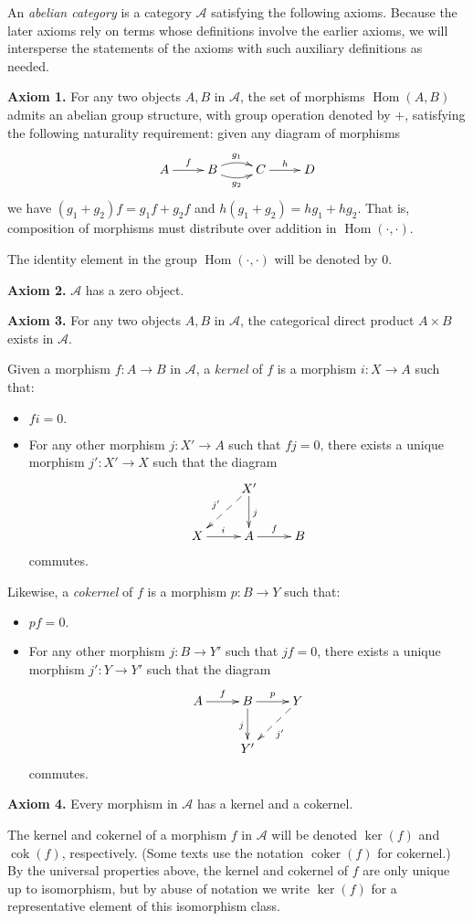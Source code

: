\documentclass[12pt]{article}
\newcommand{\A}{\mathcal{A}}
\newcommand{\Hom}{\operatorname{Hom}}
\newcommand{\cok}{\operatorname{cok}}
\begin{document}
An \emph{abelian category} is a category $\A$ satisfying the following axioms. Because the later axioms rely on terms whose definitions involve the earlier axioms, we will intersperse the statements of the axioms with such auxiliary definitions as needed.

\textbf{Axiom 1.} For any two objects $A,B$ in $\A$, the set of morphisms $\Hom(A,B)$ admits an abelian group structure, with group operation denoted by $+$, satisfying the following naturality requirement: given any diagram of morphisms
$$
\xymatrix{
A \ar[r]^{f} & B \ar@/_/[r]_{g_2} \ar@/^/[r]^{g_1} & C \ar[r]^h & D
}
$$
we have $(g_1+g_2) f = g_1 f + g_2 f$ and $h (g_1 + g_2) = h g_1 + h g_2$.
That is, composition of morphisms must distribute over addition in $\Hom(\cdot,\cdot)$.

The identity element in the group $\Hom(\cdot,\cdot)$ will be denoted by $0$.

\textbf{Axiom 2.} $\A$ has a zero object.

\textbf{Axiom 3.} For any two objects $A,B$ in $\A$, the categorical direct product $A \times B$ exists in $\A$.

Given a morphism $f\colon A \to B$ in $\A$, a \emph{kernel} of $f$ is a morphism $i\colon X \to A$ such that:

\begin{itemize}
\item $fi = 0.$
\item For any other morphism $j\colon X' \to A$ such that $fj = 0$, there exists a unique morphism $j'\colon X' \to X$ such that the diagram
$$
\xymatrix{
& X' \ar[d]^j \ar@{-->}[dl]_{j'} \\
X \ar[r]^i & A \ar[r]^f & B
}
$$
commutes.
\end{itemize}
Likewise, a \emph{cokernel} of $f$ is a morphism $p\colon B \to Y$ such that:
\begin{itemize}
\item $pf = 0.$
\item For any other morphism $j\colon B \to Y'$ such that $jf = 0$, there exists a unique morphism $j'\colon Y \to Y'$ such that the diagram
$$
\xymatrix{
A \ar[r]^f & B \ar[r]^p \ar[d]_j & Y \ar@{-->}[dl]^{j'} \\
& Y'
}
$$
commutes.
\end{itemize}

\textbf{Axiom 4.} Every morphism in $\A$ has a kernel and a cokernel.

The kernel and cokernel of a morphism $f$ in $\A$ will be denoted $\ker(f)$ and $\cok(f)$, respectively. (Some texts use the notation $\operatorname{coker}(f)$ for cokernel.) By the universal properties above, the kernel and cokernel of $f$ are only unique up to isomorphism, but by abuse of notation we write $\ker(f)$ for a representative element of this isomorphism class.
\end{document}

